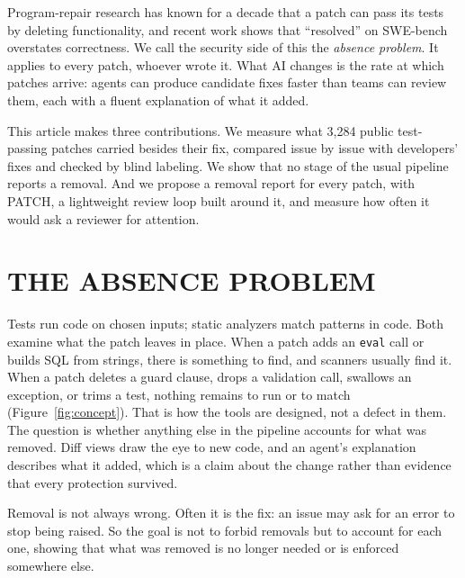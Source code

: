 \documentclass[10pt,journal,compsoc]{IEEEtran}
\newcommand{\mgsection}[1]{\section*{\MakeUppercase{#1}}}
\begin{document}
Program-repair research has known for a decade that a patch can pass its tests
by deleting functionality,\cite{qi2015plausibility} and recent work shows that
``resolved'' on SWE-bench overstates correctness.\cite{wang2026solved,aleithan2024swebenchplus}
We call the security side of this the \emph{absence problem}. It applies to
every patch, whoever wrote it. What AI changes is the rate at which patches
arrive: agents can produce candidate fixes faster than teams can review them,
each with a fluent explanation of what it added.

This article makes three contributions. We measure what 3,284 public
test-passing patches carried besides their fix, compared issue by issue with
developers' fixes and checked by blind labeling. We show that no stage of the
usual pipeline reports a removal. And we propose a removal report for every
patch, with PATCH, a lightweight review loop built around it, and measure how
often it would ask a reviewer for attention.

\mgsection{The absence problem}

Tests run code on chosen inputs; static analyzers match patterns in code. Both
examine what the patch leaves in place. When a patch adds an \texttt{eval} call
or builds SQL from strings, there is something to find, and scanners usually
find it. When a patch deletes a guard clause, drops a validation call, swallows
an exception, or trims a test, nothing remains to run or to match
(Figure~\ref{fig:concept}). That is how the tools are designed, not a defect in
them. The question is whether anything else in the pipeline accounts for what
was removed. Diff views draw the eye to new code, and an agent's explanation
describes what it added, which is a claim about the change rather than evidence
that every protection survived.

Removal is not always wrong. Often it is the fix: an issue may ask for an error
to stop being raised. So the goal is not to forbid removals but to account for
each one, showing that what was removed is no longer needed or is enforced
somewhere else.
\end{document}
